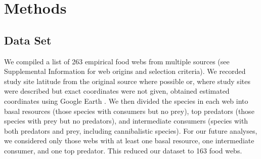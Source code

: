 \documentclass[12pt]{article}
\begin{document}
\section*{Methods}

\subsection*{Data Set} 

We compiled a list of 263 empirical food webs from
multiple sources (see Supplemental Information for web origins and selection
criteria). We recorded study site latitude from the original source where
possible or, where study sites were described but exact coordinates were not
given, obtained estimated coordinates using Google Earth \citep{GoogleEarth}.
We then divided the species in each web into basal resources (those species with
consumers but no prey), top predators (those species with prey but no predators),
and intermediate consumers (species with both predators and prey, including cannibalistic
species). For our future analyses, we considered only those webs with at least one basal
resource, one intermediate consumer, and one top predator. This reduced our dataset to
163 food webs.

\end{document}
